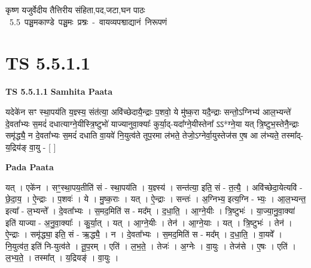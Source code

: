 \documentclass[17pt]{extarticle}
\begin{document}
\begin{titlepage}
    \begin{center}
 
\begin{sanskrit}
    { \Huge
    कृष्ण यजुर्वेदीय तैत्तिरीय संहिता,पद,जटा,घन पाठः 
    }
    \\
    \vspace{2.5cm}
    \mbox{ \Huge
    5.5      पञ्चमकाण्डे पञ्चमः प्रश्नः - वायव्यपश्वाद्यानं निरूपणं   }
\end{sanskrit}
\end{center}

\end{titlepage}
\tableofcontents
\pagebreak

\section*{ TS 5.5.1.1 }

\textbf{TS 5.5.1.1 } \newline
\textbf{Samhita Paata} \newline

यदेके॑न सꣳ स्था॒पय॑ति य॒ज्ञ्स्य॒ संत॑त्या॒ अवि॑च्छेदायै॒न्द्राः प॒शवो॒ ये मु॑ष्क॒रा यदै॒न्द्राः सन्तो॒ऽग्निभ्य॑ आल॒भ्यन्ते॑ दे॒वता᳚भ्यः स॒मदं॑ दधात्याग्ने॒यीस्त्रि॒ष्टुभो॑ याज्यानुवा॒क्याः᳚ कुर्या॒द्-यदा᳚ग्ने॒यीस्तेना᳚ ऽऽ*ग्ने॒या यत् त्रि॒ष्टुभ॒स्तेनै॒न्द्राः समृ॑द्ध्यै॒ न दे॒वता᳚भ्यः स॒मदं॑ दधाति वा॒यवे॑ नि॒युत्व॑ते तूप॒रमा ल॑भते॒ तेजो॒ऽग्नेर्वा॒युस्तेज॑स ए॒ष आ ल॑भ्यते॒ तस्मा᳚द्-य॒द्रिय॑ङ् वा॒यु - [  ] \newline

\textbf{Pada Paata} \newline

यत् । एके॑न । सꣳ॒॒स्था॒पय॒तीति॑ सं - स्था॒पय॑ति । य॒ज्ञ्स्य॑ । सन्त॑त्या॒ इति॒ सं - त॒त्यै॒ । अवि॑च्छेदा॒येत्यवि॑ - छे॒दा॒य॒ । ऐ॒न्द्राः । प॒शवः॑ । ये । मु॒ष्क॒राः । यत् । ऐ॒न्द्राः । सन्तः॑ । अ॒ग्निभ्य॒ इत्य॒ग्नि - भ्यः॒ । आ॒ल॒भ्यन्त॒ इत्या᳚ - ल॒भ्यन्ते᳚ । दे॒वता᳚भ्यः । स॒मद॒मिति॑ स - मद᳚म् । द॒धा॒ति॒ । आ॒ग्ने॒यीः । त्रि॒ष्टुभः॑ । या॒ज्या॒नु॒वा॒क्या॑ इति॑ याज्या - अ॒नु॒वा॒क्याः᳚ । कु॒र्या॒त् । यत् । आ॒ग्ने॒यीः । तेन॑ । आ॒ग्ने॒याः । यत् । त्रि॒ष्टुभः॑ । तेन॑ । ऐ॒न्द्राः । समृ॑द्ध्या॒ इति॒ सं - ऋ॒द्ध्यै॒ । न । दे॒वता᳚भ्यः । स॒मद॒मिति॑ स - मद᳚म् । द॒धा॒ति॒ । वा॒यवे᳚ । नि॒युत्व॑त॒ इति॑ नि-युत्व॑ते । तू॒प॒रम् । एति॑ । ल॒भ॒ते॒ । तेजः॑ । अ॒ग्नेः । वा॒युः । तेज॑से । ए॒षः । एति॑ । ल॒भ्य॒ते॒ । तस्मा᳚त् । य॒द्रियङ्॑ । वा॒युः ।  \newline
\end{document}
